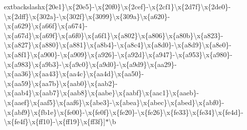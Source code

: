 \begin{DoxyCompactItemize}
extbackslash{}x\{20e1\}\textbackslash{}x\{20e5\}-\/\textbackslash{}x\{20f0\}\textbackslash{}x\{2cef\}-\/\textbackslash{}x\{2cf1\}\textbackslash{}x\{2d7f\}\textbackslash{}x\{2de0\}-\/\textbackslash{}x\{2dff\}\textbackslash{}x\{302a\}-\/\textbackslash{}x\{302f\}\textbackslash{}x\{3099\}\textbackslash{}x\{309a\}\textbackslash{}x\{a620\}-\/\textbackslash{}x\{a629\}\textbackslash{}x\{a66f\}\textbackslash{}x\{a674\}-\/\textbackslash{}x\{a67d\}\textbackslash{}x\{a69f\}\textbackslash{}x\{a6f0\}\textbackslash{}x\{a6f1\}\textbackslash{}x\{a802\}\textbackslash{}x\{a806\}\textbackslash{}x\{a80b\}\textbackslash{}x\{a823\}-\/\textbackslash{}x\{a827\}\textbackslash{}x\{a880\}\textbackslash{}x\{a881\}\textbackslash{}x\{a8b4\}-\/\textbackslash{}x\{a8c4\}\textbackslash{}x\{a8d0\}-\/\textbackslash{}x\{a8d9\}\textbackslash{}x\{a8e0\}-\/\textbackslash{}x\{a8f1\}\textbackslash{}x\{a900\}-\/\textbackslash{}x\{a909\}\textbackslash{}x\{a926\}-\/\textbackslash{}x\{a92d\}\textbackslash{}x\{a947\}-\/\textbackslash{}x\{a953\}\textbackslash{}x\{a980\}-\/\textbackslash{}x\{a983\}\textbackslash{}x\{a9b3\}-\/\textbackslash{}x\{a9c0\}\textbackslash{}x\{a9d0\}-\/\textbackslash{}x\{a9d9\}\textbackslash{}x\{aa29\}-\/\textbackslash{}x\{aa36\}\textbackslash{}x\{aa43\}\textbackslash{}x\{aa4c\}\textbackslash{}x\{aa4d\}\textbackslash{}x\{aa50\}-\/\textbackslash{}x\{aa59\}\textbackslash{}x\{aa7b\}\textbackslash{}x\{aab0\}\textbackslash{}x\{aab2\}-\/\textbackslash{}x\{aab4\}\textbackslash{}x\{aab7\}\textbackslash{}x\{aab8\}\textbackslash{}x\{aabe\}\textbackslash{}x\{aabf\}\textbackslash{}x\{aac1\}\textbackslash{}x\{aaeb\}-\/\textbackslash{}x\{aaef\}\textbackslash{}x\{aaf5\}\textbackslash{}x\{aaf6\}\textbackslash{}x\{abe3\}-\/\textbackslash{}x\{abea\}\textbackslash{}x\{abec\}\textbackslash{}x\{abed\}\textbackslash{}x\{abf0\}-\/\textbackslash{}x\{abf9\}\textbackslash{}x\{fb1e\}\textbackslash{}x\{fe00\}-\/\textbackslash{}x\{fe0f\}\textbackslash{}x\{fe20\}-\/\textbackslash{}x\{fe26\}\textbackslash{}x\{fe33\}\textbackslash{}x\{fe34\}\textbackslash{}x\{fe4d\}-\/\textbackslash{}x\{fe4f\}\textbackslash{}x\{ff10\}-\/\textbackslash{}x\{ff19\}\textbackslash{}x\{ff3f\}\mbox{]}$\ast$\textbackslash{}b\textquotesingle{}\hypertarget{classMatthiasMullie_1_1Minify_1_1JS_a4ccd6320f1fa10facc665a79fb05fde1}{}\label{classMatthiasMullie_1_1Minify_1_1JS_a4ccd6320f1fa10facc665a79fb05fde1}

\end{DoxyCompactItemize}
